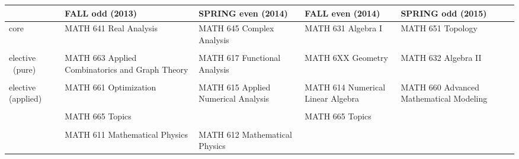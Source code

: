 \documentclass[12pt]{report}
\begin{document}
\pagestyle{empty}

\begin{center}
\begin{sidewaystable}
\begin{tabular}{| p{2cm} || p{5.0cm} | p{5.0cm} || p{5.0cm} | p{5.0cm} |}

\hline
& \textbf{FALL odd (2013)} & \textbf{SPRING even (2014)} & \textbf{FALL even (2014)} & \textbf{SPRING odd (2015)} \\
\hline\hline
core & MATH 641 Real Analysis & MATH 645 Complex Analysis & MATH 631 Algebra I & MATH 651 Topology \\
&  &&&\\
\hline
elective 
~(pure) & MATH 663 Applied Combinatorics and Graph Theory & MATH 617 Functional Analysis & MATH 6XX Geometry & MATH 632 Algebra II \\
&  &&  & \\
\hline
elective 
(applied)
& MATH 661 Optimization & MATH 615 Applied Numerical Analysis & MATH 614 Numerical Linear Algebra & MATH 660 Advanced Mathematical Modeling \\
& \\
\hline
& MATH 665 Topics && MATH 665 Topics&\\
&  &&  &\\
\hline
& MATH 611 Mathematical Physics & MATH 612 Mathematical Physics&& \\
\hline
\end{tabular}
\end{sidewaystable}
\end{center}
\end{document}
